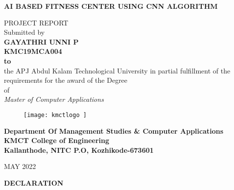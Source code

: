 \documentclass[a4paper,12pt,toc=flat]{report}
\begin{document}
	
	{\centering \bf \large
		 AI BASED FITNESS CENTER USING CNN ALGORITHM\par
	}
	\begin{center}
		{\small PROJECT REPORT} \vspace*{17pt}
		\\ Submitted by\\
		\vspace*{17pt}
		{\bf GAYATHRI UNNI P \\
			KMC19MCA004\\
			\vspace*{23pt}
			to}\\
		\vspace*{15pt}
		the APJ Abdul Kalam Technological University in partial fulfillment of
		the requirements for the award of the Degree\\
		\vspace*{9pt} of\\
		\vspace*{9pt} \textit{ Master of Computer Applications
		} 
		\vspace*{15pt}
		\begin{figure}[bph]
			\centering
			\texttt{[image: kmctlogo ]}
			
			\label{fig:kmctlogo}
		\end{figure}
		
		\bf{Department Of Management Studies  \& Computer Applications
			\vspace*{12pt}
			\\KMCT College of Engineering
			\vspace*{8pt}
			\\Kallanthode, NITC P.O, Kozhikode-673601}
		
	\end{center}
	\begin{center}
		\vspace*{6pt}MAY 2022
	\end{center}
	
	\thispagestyle{empty}
	\clearpage
	\pagebreak

	
		{\centering \bf \large
		DECLARATION\par
	}
	
\end{document}
